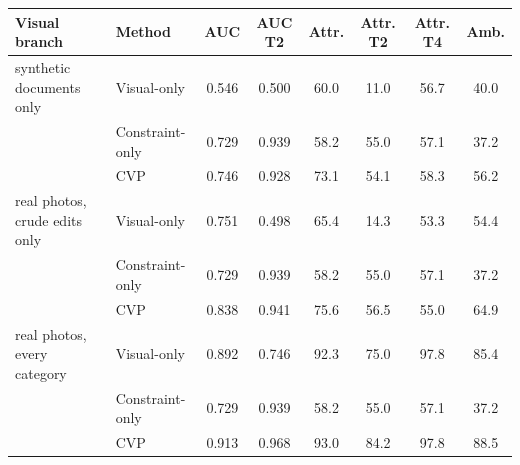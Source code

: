 \begin{tabular}{llcccccc}
\toprule
Visual branch & Method & AUC & AUC T2 & Attr. & Attr. T2 & Attr. T4 & Amb.\\
\midrule
synthetic documents only & Visual-only & 0.546 & 0.500 & 60.0 & 11.0 & 56.7 & 40.0\\
 & Constraint-only & 0.729 & 0.939 & 58.2 & 55.0 & 57.1 & 37.2\\
 & CVP & 0.746 & 0.928 & 73.1 & 54.1 & 58.3 & 56.2\\
\midrule
real photos, crude edits only & Visual-only & 0.751 & 0.498 & 65.4 & 14.3 & 53.3 & 54.4\\
 & Constraint-only & 0.729 & 0.939 & 58.2 & 55.0 & 57.1 & 37.2\\
 & CVP & 0.838 & 0.941 & 75.6 & 56.5 & 55.0 & 64.9\\
\midrule
real photos, every category & Visual-only & 0.892 & 0.746 & 92.3 & 75.0 & 97.8 & 85.4\\
 & Constraint-only & 0.729 & 0.939 & 58.2 & 55.0 & 57.1 & 37.2\\
 & CVP & 0.913 & 0.968 & 93.0 & 84.2 & 97.8 & 88.5\\
\bottomrule
\end{tabular}
